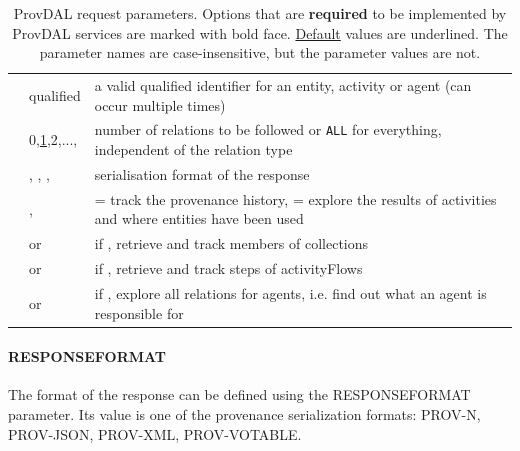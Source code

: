 \begin{table}[h]
\small
\begin{tabulary}{1.0\textwidth}{@{}p{0.25\textwidth}p{0.15\textwidth}p{0.53\textwidth}@{}}
\toprule
{} &  & \\\hline
\midrule
\textbf{} & qualified  & a valid qualified identifier for an entity, activity or agent (can occur multiple times)\\
\textbf{} & 0,\underline{1},2,...,  &  number of relations to be followed or \texttt{ALL} for everything, independent of the relation type\\
\textbf{} & , \newline{}, \newline{}, \newline{} & serialisation format of the response\\\hline
{} & ,  &  = track the provenance history, \newline{} = explore the results of activities and where entities have been used\\
 &  or  & if , retrieve and track members of collections\\
 &  or  & if , retrieve and track steps of activityFlows\\
 &  or  & if , explore all relations for agents, i.e. find out what an agent is responsible for\\
\bottomrule
\end{tabulary}
\caption{ProvDAL request parameters. Options that are \textbf{required} to be implemented by ProvDAL services are marked with bold face. \underline{Default} values are underlined. The parameter names are case-insensitive, but the parameter values are not.}
\label{tab:provdal-parameters}
\end{table}


\paragraph{RESPONSEFORMAT}
The format of the response can be defined using the RESPONSEFORMAT parameter. Its value is one of the provenance serialization formats: PROV-N, PROV-JSON, PROV-XML, PROV-VOTABLE.

